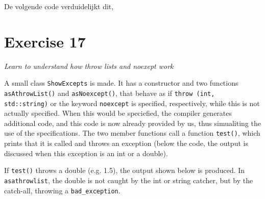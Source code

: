 \documentclass[12pt]{article}
\newcommand{\desc}[1]{\textit{#1} \vspace{1em}}
\begin{document}
De volgende code verduidelijkt dit,











\clearpage
\section*{Exercise 17}
\desc{Learn to understand how throw lists and noexept work}

A small class \texttt{ShowExcepts} is made. It has a constructor and two functions \texttt{asAthrowList()} and \texttt{asNoexcept()}, that behave as if \texttt{throw (int, std::string)} or the keyword \texttt{noexcept} is specified, respectively, while this is not actually specified. When this would be speciefied, the compiler generates additional code, and this code is now already provided by us, thus simualiting the use of the specifications. 
The two member functions call a function \texttt{test()}, which prints that it is called and throws an exception (below the code, the output is discussed when this exception is an int or a double). 











If \texttt{test()} throws a double (e.g. 1.5), the output shown below is produced. In \texttt{asathrowlist}, the double is not caught by the int or string catcher, but by the catch-all, throwing a \texttt{bad\_exception}. 
\end{document}
